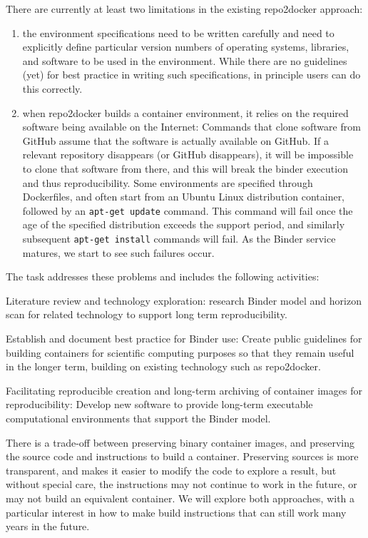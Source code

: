 \begin{task}[
  title=Improving robustness of reproducibility in repo2docker,
  id=reproducibility,
  lead=MP,
  PM=42,
  wphases={0-36},
  partners={SRL,QS,UIO}
]
  There are currently at least two limitations in the existing
  repo2docker approach:
\begin{enumerate}
\item the environment specifications need to be written carefully and
  need to explicitly define particular version numbers of operating
  systems, libraries, and software to be used in the
  environment. While there are no guidelines (yet) for best practice
  in writing such specifications, in principle users can do this
  correctly.
\item when repo2docker builds a container environment, it relies on
  the required software being available on the Internet: Commands that
  clone software from GitHub assume that the software is actually
  available on GitHub. If a relevant repository disappears (or GitHub
  disappears), it will be impossible to clone that software from
  there, and this will break the binder execution and thus
  reproducibility. Some environments are specified through
  Dockerfiles, and often start from an Ubuntu Linux distribution
  container, followed by an \texttt{apt-get update} command. This
  command will fail once the age of the specified distribution exceeds
  the support period, and similarly subsequent \texttt{apt-get
    install} commands will fail. As the Binder service matures, we
  start to see such failures occur.
\end{enumerate}

The task addresses these problems and includes the following activities:
\begin{compactitem}

\item Literature review and technology exploration: research Binder
  model and horizon scan for related technology to support long term
  reproducibility.

\item Establish and document best practice for Binder use: Create
  public guidelines for building containers for scientific computing
  purposes so that they remain useful in the longer term, building on
  existing technology such as repo2docker.

\item Facilitating reproducible creation and long-term archiving of
  container images for reproducibility: Develop new software to
  provide long-term executable computational environments that support
  the Binder model.

  There is a trade-off between preserving binary container images, and
  preserving the source code and instructions to build a container.
  Preserving sources is more transparent, and makes it easier to
  modify the code to explore a result, but without special care, the
  instructions may not continue to work in the future, or may not
  build an equivalent container.  We will explore both approaches,
  with a particular interest in how to make build instructions that
  can still work many years in the future.


\end{compactitem}
\end{task}
